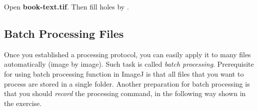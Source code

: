 \begin{indentexercise}{1}
Open \textbf{book-text.tif}. Then fill holes by . 
\end{indentexercise}

\clearpage
\subsection{Batch Processing Files}

Once you established a processing protocol, you can easily apply it to many files automatically (image by image). Such task is
called \textit{batch processing}.
Prerequisite for using batch processing function in ImageJ is that all
files that you want to process are stored in a single folder. Another
preparation for batch processing is that you should
\textit{record} the processing command,
in the following way shown in the exercise.



